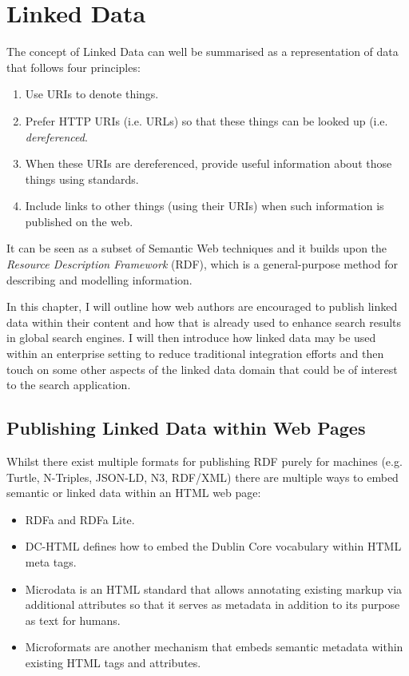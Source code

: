 \chapter{Linked Data}
\label{stateoftheart}

The concept of Linked Data can well be summarised as a representation of
data that follows four principles:\cite{berners2011linked}

\begin{enumerate}
  \item Use URIs to denote things.
  \item Prefer HTTP URIs (i.e. URLs) so that these things can be looked
    up (i.e. \emph{dereferenced}.
  \item When these URIs are dereferenced, provide useful information about
    those things using standards.
  \item Include links to other things (using their URIs) when such
    information is published on the web.
\end{enumerate}

It can be seen as a subset of Semantic Web techniques and it builds upon
the \emph{Resource Description Framework} (RDF)\cite{lassila1999resource},
which is a general-purpose method for describing and modelling information.

In this chapter, I will outline how web authors are encouraged to publish
linked data within their content and how that is already used to enhance
search results in global search engines. I will then introduce how linked
data may be used within an enterprise setting to reduce traditional
integration efforts and then touch on some other aspects of the linked
data domain that could be of interest to the search application.

\section{Publishing Linked Data within Web Pages}
\label{publishing-linked-data}

Whilst there exist multiple formats for publishing RDF purely for machines
(e.g. Turtle\cite{world2014rdf}, N-Triples, JSON-LD\cite{world2014json},
N3, RDF/XML) there are multiple ways to embed semantic or linked data within
an HTML web page:

\begin{itemize}
  \item RDFa\cite{adida2012rdfa} and RDFa Lite\cite{lite2004rdfa}.
  \item DC-HTML defines how to embed the Dublin Core vocabulary within HTML
    meta tags.
  \item Microdata is an HTML standard that allows annotating existing markup
    via additional attributes so that it serves as metadata in addition to
    its purpose as text for humans.
  \item Microformats are another mechanism that embeds semantic metadata
    within existing HTML tags and attributes.
\end{itemize}

